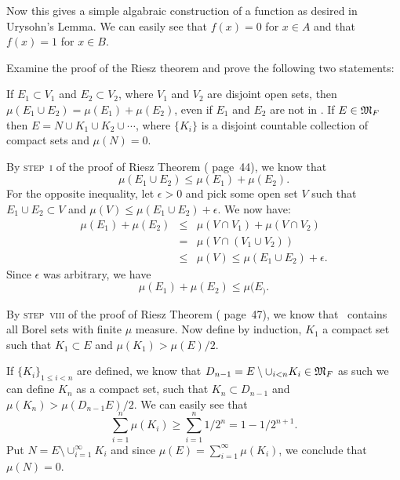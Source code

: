 \begin{enumerate}
Now this gives a simple algabraic construction of a function
as desired in Urysohn's Lemma. We can easily see
that \(f(x)=0\) for \(x\in A\) and
that \(f(x)=1\) for \(x\in B\).

\begin{excopy}
Examine the proof of the
Riesz theorem and prove the following two statements:
\begin{itemize}
   If \(E_1 \subset V_1\) and \(E_2 \subset V_2\), where \(V_1\) and \(V_2\)
   are disjoint open sets, then \(\mu(E_1\cup E_2) = \mu(E_1) + \mu(E_2)\),
   even if \(E_1\) and \(E_2\) are not in \frakM.
   If \(E\in \mathfrak{M}_F\) then
   \(E = N\cup K_1\cup K_2 \cup \cdots\), where \(\{K_i\}\)
   is a disjoint countable collection of compact sets and \(\mu(N) = 0\).
\end{itemize}
\end{excopy}


\begin{itemize}
   By \textsc{step~i} of the proof of Riesz Theorem (\cite{RudinRCA80} page~44),
   we know that
   \begin{equation*}
   \mu(E_1\cup E_2) \leq \mu(E_1) + \mu(E_2).
   \end{equation*}
   For the opposite inequality, let \(\epsilon>0\) and pick
   some open set $V$ such that \(E_1\cup E_2\subset V\) and
   \(\mu(V) \leq \mu(E_1\cup E_2) + \epsilon\).
   We now have:
   \begin{eqnarray*}
   \mu(E_1) + \mu(E_2)
    & \leq & \mu(V\cap V_1) + \mu(V\cap V_2) \\
    & = & \mu\left(V\cap (V_1 \cup V_2)\right) \\
    & \leq & \mu(V) \leq \mu(E_1\cup E_2) + \epsilon.
   \end{eqnarray*}
   Since \(\epsilon\) was arbitrary, we have
   \begin{equation*}
   \mu(E_1) + \mu(E_2) \leq \mu(E_).
   \end{equation*}

   By \textsc{step~viii} of the proof of Riesz Theorem
   (\cite{RudinRCA80} page~47), we know that \frakM\ contains all
   Borel sets with finite \(\mu\) measure.
   Now define by induction, \(K_1\) a compact set such that
   \(K_1\subset E\) and \(\mu(K_1) > \mu(E)/2\).

   If \(\{K_i\}_{1\leq i<n}\) are defined, we know that
   \(D_{n-1} = E\setminus \cup_{i<n} K_i \in \mathfrak{M}_F\) as such
   we can define \(K_n\)
   as a compact set, such that \(K_n \subset D_{n-1}\)
   and \(\mu(K_n) > \mu(D_{n-1}E)/2\).
   We can easily see that
   \begin{equation*}
    \sum_{i=1}^n \mu(K_i) \geq \sum_{i=1}^n 1/2^n = 1 - 1/2^{n+1}.
   \end{equation*}
   Put \(N = E \setminus \cup_{i=1}^\infty K_i\)
   and since \(\mu(E) = \sum_{i=1}^\infty \mu(K_i)\),
   we conclude that \(\mu(N) = 0\).
\end{itemize}

\end{enumerate}

